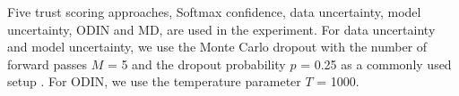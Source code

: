 \documentclass[journal]{IEEEtran}
\begin{document}
Five trust scoring approaches, Softmax confidence, data uncertainty, model uncertainty, ODIN and MD, are used in the experiment. For data uncertainty and model uncertainty, we use the Monte Carlo dropout \cite{gal2016dropout} with the number of forward passes $M$ = 5 and the dropout probability $p$ = 0.25 as a commonly used setup \cite{ovadia2019can}. For ODIN, we use the temperature parameter $T$ = 1000.


%
%
%
%
\end{document}

